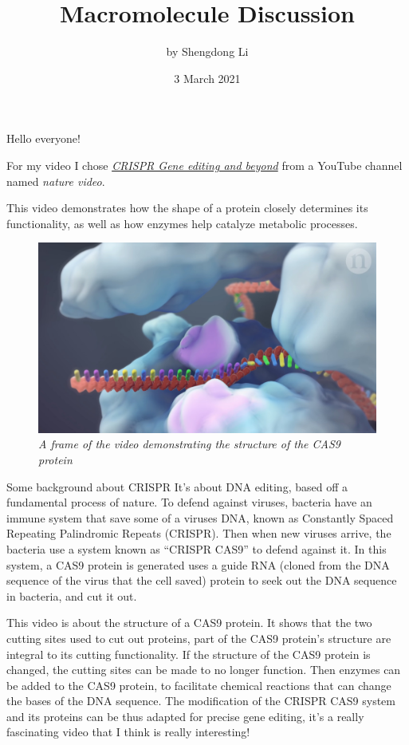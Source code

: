 \documentclass[12pt]{article}
\begin{document}
\title{Macromolecule Discussion}
\author{by Shengdong Li}
\date{3 March 2021}
\maketitle

Hello everyone!

For my video I chose \href{https://www.youtube.com/watch?v=4YKFw2KZA5o}{\textit{CRISPR\: Gene editing and beyond}} from a YouTube channel named \textit{nature video}.

This video demonstrates how the shape of a protein closely determines its functionality, as well as how enzymes help catalyze metabolic processes.

\begin{figure}[H]
  \begin{center}
    \includegraphics[scale=.2]{snapshot.jpg}
    \caption{\textit{A frame of the video demonstrating the structure of the CAS9 protein}}
  \end{center}
\end{figure}

Some background about CRISPR\: It's about DNA editing, based off a fundamental process of nature. To defend against viruses, bacteria have an immune system that save some of a viruses DNA, known as Constantly Spaced Repeating Palindromic Repeats (CRISPR). Then when new viruses arrive, the bacteria use a system known as ``CRISPR CAS9'' to defend against it. In this system, a CAS9 protein is generated uses a guide RNA (cloned from the DNA sequence of the virus that the cell saved) protein to seek out the DNA sequence in bacteria, and cut it out.

This video is about the structure of a CAS9 protein. It shows that the two cutting sites used to cut out proteins, part of the CAS9 protein's structure are integral to its cutting functionality. If the structure of the CAS9 protein is changed, the cutting sites can be made to no longer function. Then enzymes can be added to the CAS9 protein, to facilitate chemical reactions that can change the bases of the DNA sequence. The modification of the CRISPR CAS9 system and its proteins can be thus adapted for precise gene editing, it's a really fascinating video that I think is really interesting!
\end{document}
